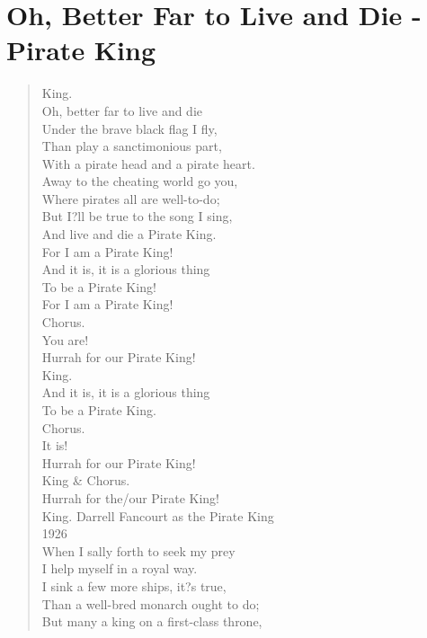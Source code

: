 \documentclass[11pt]{article}
\begin{document}
\section{Oh, Better Far to Live and Die - Pirate King}
\label{sec:orgbb4d250}
\begin{verse}
King.\\
Oh, better far to live and die\\
Under the brave black flag I fly,\\
Than play a sanctimonious part,\\
With a pirate head and a pirate heart.\\
Away to the cheating world go you,\\
Where pirates all are well-to-do;\\
But I?ll be true to the song I sing,\\
And live and die a Pirate King.\\
\vspace*{1em}
For I am a Pirate King!\\
And it is, it is a glorious thing\\
To be a Pirate King!\\
\vspace*{1em}
For I am a Pirate King!\\
Chorus.\\
You are!\\
Hurrah for our Pirate King!\\
King.\\
And it is, it is a glorious thing\\
To be a Pirate King.\\
Chorus.\\
It is!\\
Hurrah for our Pirate King!\\
King \& Chorus.\\
Hurrah for the/our Pirate King!\\
\vspace*{1em}
King. Darrell Fancourt as the Pirate King\\
1926\\
\vspace*{1em}
When I sally forth to seek my prey\\
I help myself in a royal way.\\
I sink a few more ships, it?s true,\\
Than a well-bred monarch ought to do;\\
But many a king on a first-class throne,\\

\end{verse}
\end{document}
